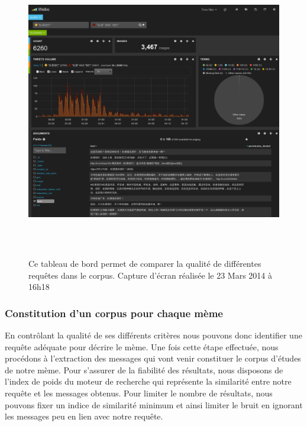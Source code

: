     \begin{figure}[htpb]
        \centering
        \includegraphics[width=6.0004in,height=5.078in]{figures/chap4/ui/ui-kibana.png}
        \caption[Tableau de bords requêtes par mots-clés] { Ce tableau de bord permet de comparer la qualité de différentes requ\^etes dans le corpus. Capture d'écran réalisée le 23 Mars 2014 à 16h18}
        \label{fig:kibana}
    \end{figure}

\subsubsection[Constitution d'un corpus pour chaque mème]{Constitution d'un corpus pour chaque mème}

    En contrôlant la qualité de ses différents critères nous pouvons donc identifier une requête adéquate pour décrire le mème. Une fois cette étape effectuée, nous procédons à l'extraction des messages qui vont venir constituer le corpus d'études de notre mème. Pour s'assurer de la fiabilité des résultats, nous disposons de l'index de poids du moteur de recherche qui représente la similarité entre notre requête et les messages obtenus. Pour limiter le nombre de résultats, nous pouvons fixer un indice de similarité minimum et ainsi limiter le bruit en ignorant les messages peu en lien avec notre requête.


